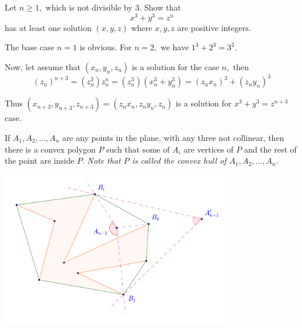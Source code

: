 \documentclass{article}
\begin{document}
\begin{problem}
    Let $n \ge 1,$ which is not divisible by 3. Show that
    \[
        x^3+y^3 = z^n
    \]
    has at least one solution $(x,y,z)$ where $x,y,z$ are positive integers.
\end{problem}

\begin{soln}
    The base case $n=1$ is obvious. For $n=2,$ we have $1^3 + 2^3 = 3^2.$
    
    Now, let assume that $(x_n,y_n,z_n)$ is a solution for the case $n,$ then
    \[
        (z_n)^{n+3} = (z_n^3)z_n^{n} = (z_n^3)(x_n^3+y_n^3) = (z_nx_n)^3 + (z_ny_n)^3
    \]

    Thus $(x_{n+3},y_{n+3},z_{n+3}) = (z_nx_n, z_ny_n, z_n)$ is a solution for $x^3+y^3 = z^{n+3}$ case.
\end{soln}

\begin{problem}
    If $A_1, A_2, \ldots, A_n$ are any points in the plane, with any three not collinear,
    then there is a convex polygon $P$ such that some of $A_i$ are vertices of $P$ and the rest of the point are inside $P$.
    \textit{Note that $P$ is called the convex hull of $A_1, A_2, \ldots, A_n.$}
\end{problem}

\begin{center}
    \includegraphics[width=10cm]{./svg/pdf/23-24-s5-o-p32.pdf}
\end{center}
\end{document}
